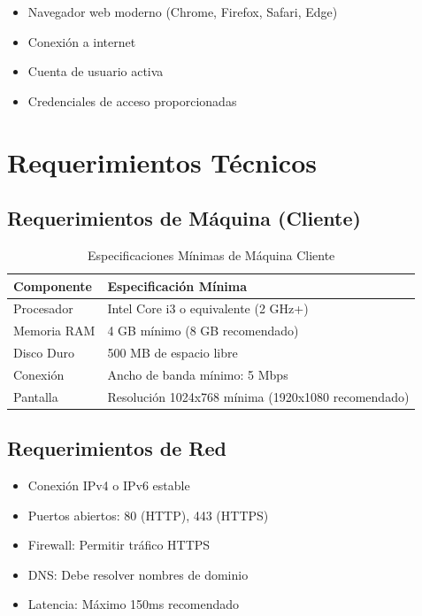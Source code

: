 \documentclass[12pt,a4paper,spanish,oneside]{report}
\begin{document}
\begin{itemize}
    \item Navegador web moderno (Chrome, Firefox, Safari, Edge)
    \item Conexión a internet
    \item Cuenta de usuario activa
    \item Credenciales de acceso proporcionadas
\end{itemize}

\section{Requerimientos Técnicos}

\subsection{Requerimientos de Máquina (Cliente)}

\begin{table}[H]
\centering
\caption{Especificaciones Mínimas de Máquina Cliente}
\begin{tabular}{|l|l|}
\hline
\textbf{Componente} & \textbf{Especificación Mínima} \\
\hline
Procesador & Intel Core i3 o equivalente (2 GHz+) \\
\hline
Memoria RAM & 4 GB mínimo (8 GB recomendado) \\
\hline
Disco Duro & 500 MB de espacio libre \\
\hline
Conexión & Ancho de banda mínimo: 5 Mbps \\
\hline
Pantalla & Resolución 1024x768 mínima (1920x1080 recomendado) \\
\hline
\end{tabular}
\end{table}

\subsection{Requerimientos de Red}

\begin{itemize}
    \item Conexión IPv4 o IPv6 estable
    \item Puertos abiertos: 80 (HTTP), 443 (HTTPS)
    \item Firewall: Permitir tráfico HTTPS
    \item DNS: Debe resolver nombres de dominio
    \item Latencia: Máximo 150ms recomendado
\end{itemize}
\end{document}
